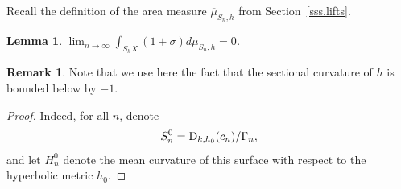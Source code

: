 \documentclass[11pt]{article}
\theoremstyle{plain}
\newtheorem{lemma}[theorem]{Lemma}
\theoremstyle{definition}
\newtheorem{remark}[theorem]{Remark}
\begin{document}
Recall the definition of the area measure $\overline{\mu}_{S_n,h}$ from Section~\ref{sss.lifts}.

\begin{lemma}\label{l.sect_approaches-1}
$\displaystyle\lim_{n\to\infty} \int_{S_hX}(1+\sigma)d\overline{\mu}_{S_n,h}=0$.
\end{lemma}

\begin{remark}
Note that we use here the fact that the sectional curvature of $h$ is bounded below by $-1$.
\end{remark}

\begin{proof}
Indeed, for all $n$, denote\vspace*{-3pt}
\begin{equation*}
S_n^0=\text D_{k,h_0}(c_n)/\Gamma_n,
\end{equation*}
and let $H_n^0$ denote the mean curvature of this surface with respect to the hyperbolic metric $h_0$.


\end{proof}
\end{document}

